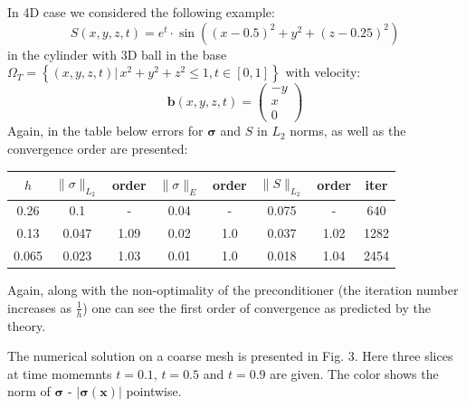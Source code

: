 \documentclass[12pt]{article}
\begin{document}
In 4D case we considered the following example:
$$
S(x,y,z,t) = e^t \cdot \operatorname{sin} \left(
(x - 0.5)^2 + y^2  + (z-0.25)^2 \right)
$$
in the cylinder with 3D ball in the base $\Omega_T = \left\{ (x,y,z,t) | \, x^2+y^2+z^2 \leq 1, t \in [0,1]  \right\}$ 
with velocity:
$$
\mathbf{b}(x,y,z,t) = \left(
 \begin{array}{c}
 - y \\
 x \\
 0
 \end{array}
  \right)
$$
Again, in the table below errors for $\mathbf{\sigma}$ and $S$ in $L_2$ norms, as well as the convergence order are presented:
\begin{center}
\begin{tabular}{|c|c|c|c|c|c|c|c|}
\hline
$h$ & $\parallel \sigma \parallel_{L_2}$ & order & $\parallel \sigma \parallel_{E}$ & order  & $\parallel S \parallel_{L_2}$ & order  & iter \\
\hline
0.26  & 0.1   & -     & 0.04 & -   & 0.075 & -    & 640 \\
\hline
0.13  & 0.047 & 1.09  & 0.02 & 1.0 & 0.037 & 1.02 & 1282 \\
\hline
0.065 & 0.023 & 1.03  & 0.01 & 1.0 & 0.018 & 1.04 & 2454 \\
\hline
\end{tabular}
\end{center}
Again, along with the non-optimality of the preconditioner (the iteration number increases as $\frac{1}{h}$) one can see the first order of convergence as predicted by the theory.

The numerical solution on a coarse mesh is presented in Fig. 3. Here three slices at time momemnts $t=0.1$, $t=0.5$ and $t = 0.9$ are given. The color shows the norm of $\pmb{\sigma}$ - $| \pmb{\sigma} (\mathbf{x})| $ pointwise.
\end{document}
